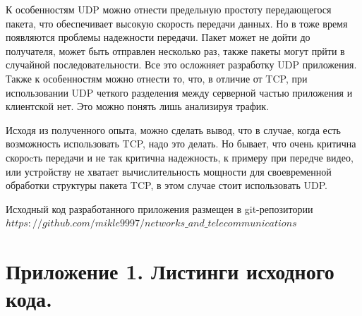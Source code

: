 \documentclass[a4paper,14pt]{extarticle}
\begin{document}
К особенностям UDP можно отнести предельную простоту передающегося пакета, что обеспечивает высокую скорость передачи данных. Но в тоже время появляются проблемы надежности передачи. Пакет может не дойти до получателя, может быть отправлен несколько раз, также пакеты могут прйти в случайной последовательности. Все это осложняет разработку UDP приложения. Также к особенностям можно отнести то, что, в отличие от TCP, при использовании UDP четкого разделения между серверной частью приложения и клиентской нет. Это можно понять лишь анализируя трафик.

Исходя из полученного опыта, можно сделать вывод, что в случае, когда есть возможность использовать TCP, надо это делать. Но бывает, что очень критична скороcть передачи и не так критична надежность, к примеру при передче видео, или устройству не хватает вычислительность мощности для своевременной обработки структуры пакета TCP, в этом случае стоит использовать UDP.

Исходный код разработанного приложения размещен в git-репозитории $https://github.com/mikle9997/networks\_and\_telecommunications$

\section{Приложение 1. Листинги исходного кода. }





























\end{document}
